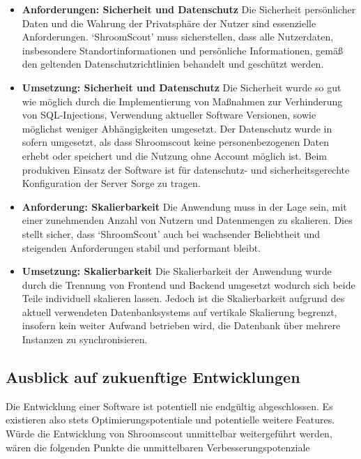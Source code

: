 \documentclass[../main.tex]{subfiles}
\begin{document}
\begin{itemize}
	\item \textbf{Anforderungen: Sicherheit und Datenschutz}
	      Die Sicherheit persönlicher Daten und die Wahrung der Privatsphäre der Nutzer sind essenzielle Anforderungen. `ShroomScout'
	      muss sicherstellen, dass alle Nutzerdaten, insbesondere Standortinformationen und persönliche Informationen, gemäß den
	      geltenden Datenschutzrichtlinien behandelt und geschützt werden.

	\item \textbf{Umsetzung: Sicherheit und Datenschutz}
	      Die Sicherheit wurde so gut wie möglich durch die Implementierung von Maßnahmen zur Verhinderung von SQL-Injections, Verwendung aktueller
	      Software Versionen, sowie möglichst weniger Abhängigkeiten umgesetzt. Der Datenschutz wurde in sofern umgesetzt, als dass Shroomscout keine
	      personenbezogenen Daten erhebt oder speichert und die Nutzung ohne Account möglich ist. Beim produkiven Einsatz der Software ist für datenschutz-
	      und sicherheitsgerechte Konfiguration der Server Sorge zu tragen.

	\item \textbf{Anforderung: Skalierbarkeit}
	      Die Anwendung muss in der Lage sein, mit einer zunehmenden Anzahl von Nutzern und Datenmengen zu skalieren. Dies stellt
	      sicher, dass `ShroomScout' auch bei wachsender Beliebtheit und steigenden Anforderungen stabil und performant bleibt.

	\item \textbf{Umsetzung: Skalierbarkeit}
	      Die Skalierbarkeit der Anwendung wurde durch die Trennung von Frontend und Backend umgesetzt wodurch sich beide Teile individuell skalieren lassen.
	      Jedoch ist die Skalierbarkeit aufgrund des aktuell verwendeten Datenbanksystems auf vertikale Skalierung begrenzt, insofern kein weiter Aufwand betrieben wird,
	      die Datenbank über mehrere Instanzen zu synchronisieren.

\end{itemize}

\subsection{Ausblick auf zukuenftige Entwicklungen}

Die Entwicklung einer Software ist potentiell nie endgültig abgeschlossen. Es existieren also stets Optimierungspotentiale und potentielle weitere Features.
Würde die Entwicklung von Shroomscout unmittelbar weitergeführt werden, wären die folgenden Punkte die unmittelbaren Verbesserungspotenziale
\end{document}
